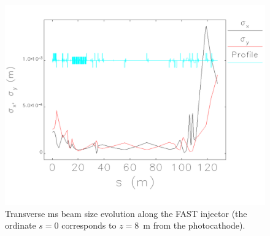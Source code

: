 \documentclass[notitlepage,twocolumn,nofootinbib,showpacs,preprintnumbers,superscriptaddress,amsmath,amssymb]{revtex4-1}
\begin{document}
\begin{figure}[hhhhh!!!!]
\begin{center}
\includegraphics[width=0.95\linewidth]{injectortodump_rms.pdf}
\caption{Transverse ms beam size evolution along the FAST injector (the ordinate $s=0$ corresponds to $z=8$~m from the photocathode). \label{rms} }
\end{center}
\end{figure}
%
\end{document}

